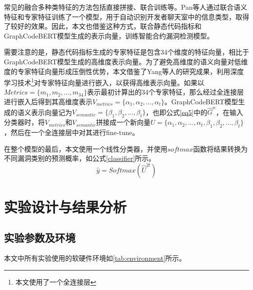 常见的融合多种类特征的方法包括直接拼接、联合训练等。Pan等人\cite{pan2021}通过联合语义特征和专家特征训练了一个模型，用于自动识别开发者聊天室中的信息类型，取得了较好的效果。因此，本文也借鉴这种方式，联合静态代码指标和GraphCodeBERT模型生成的表示向量，训练智能合约漏洞检测模型。

需要注意的是，静态代码指标生成的专家特征是包含34个维度的特征向量，相比于GraphCodeBERT模型生成的高维度表示向量。为了避免高维度的语义向量对低维度的专家特征向量形成压倒性优势，本文借鉴了Yang等人\cite{yang2015}的研究成果，利用深度学习技术\footnote{本文使用了一个全连接层}对专家特征向量进行嵌入，以获得高维表示向量。如果以$Metrics=\{m_1,m_2,\ldots,m_{34}\}$表示最初计算出的34个专家特征，那么经过全连接层进行嵌入后得到其高维度表示$V_{metrics}=\{\alpha_1,\alpha_2,\ldots,\alpha_t\}$。GraphCodeBERT模型生成的语义表示向量记为$V_{semantic}=\{\beta_1,\beta_2,\ldots,\beta_t\}$，也即公式\eqref{eq5}中的$\hat{G}^n$，在输入分类器时，将$V_{metrics}$和$V_{semantic}$拼接成一个新向量$U=\{\alpha_1,\alpha_2,\ldots,\alpha_t,\beta_1,\beta_2,\ldots,\beta_t\}$，然后在一个全连接层中对其进行fine-tune。

在整个模型的最后，本文使用一个线性分类器，并使用$softmax$函数将结果转换为不同漏洞类别的预测概率，如公式\eqref{classifier}所示。
\begin{equation}
\hat{y}=Softmax(\hat{U}^{2t}) \label{classifier}
\end{equation}
\section{实验设计与结果分析}
\label{sec:实验设计与结果分析}


\subsection{实验参数及环境}
\label{sec:实验参数及环境}
本文中所有实验使用的软硬件环境如\autoref{tab:environment}所示。

